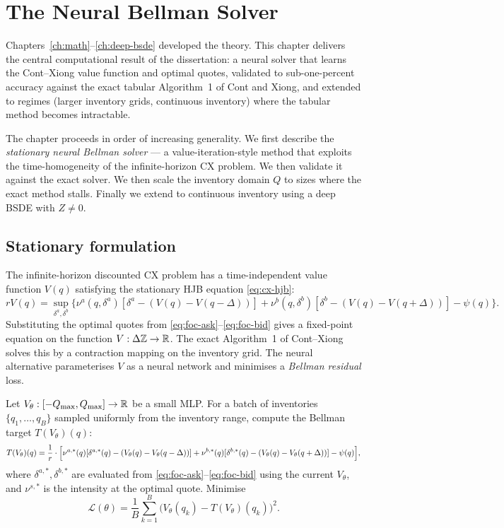 \chapter{The Neural Bellman Solver}
\label{ch:bellman}

Chapters~\ref{ch:math}--\ref{ch:deep-bsde} developed the theory. This chapter delivers the central computational result of the dissertation: a neural solver that learns the Cont--Xiong value function and optimal quotes, validated to sub-one-percent accuracy against the exact tabular Algorithm~1 of Cont and Xiong, and extended to regimes (larger inventory grids, continuous inventory) where the tabular method becomes intractable.

The chapter proceeds in order of increasing generality. We first describe the \emph{stationary neural Bellman solver} --- a value-iteration-style method that exploits the time-homogeneity of the infinite-horizon CX problem. We then validate it against the exact solver. We then scale the inventory domain $Q$ to sizes where the exact method stalls. Finally we extend to continuous inventory using a deep BSDE with $Z \neq 0$.

\section{Stationary formulation}
\label{sec:stationary}

The infinite-horizon discounted CX problem has a time-independent value function $V(q)$ satisfying the stationary HJB equation \eqref{eq:cx-hjb}:
\[
  r V(q) = \sup_{\delta^a, \delta^b} \bigl\{ \nu^a(q, \delta^a) [\delta^a - (V(q) - V(q - \Delta))] + \nu^b(q, \delta^b) [\delta^b - (V(q) - V(q + \Delta))] - \psi(q) \bigr\}.
\]
Substituting the optimal quotes from \eqref{eq:foc-ask}--\eqref{eq:foc-bid} gives a fixed-point equation on the function $V : \Delta \mathbb{Z} \to \mathbb{R}$. The exact Algorithm~1 of Cont--Xiong solves this by a contraction mapping on the inventory grid. The neural alternative parameterises $V$ as a neural network and minimises a \emph{Bellman residual} loss.

\begin{definition}
\label{def:neural-bellman}
Let $V_\theta : [-Q_{\max}, Q_{\max}] \to \mathbb{R}$ be a small MLP. For a batch of inventories $\{q_1, \ldots, q_B\}$ sampled uniformly from the inventory range, compute the Bellman target $T(V_\theta)(q)$:
\begin{equation}
  T(V_\theta)(q) = \frac{1}{r} \cdot \Bigl[\nu^{a,*}(q) [\delta^{a,*}(q) - (V_\theta(q) - V_\theta(q - \Delta))] + \nu^{b,*}(q) [\delta^{b,*}(q) - (V_\theta(q) - V_\theta(q + \Delta))] - \psi(q)\Bigr],
\end{equation}
where $\delta^{a,*}, \delta^{b,*}$ are evaluated from \eqref{eq:foc-ask}--\eqref{eq:foc-bid} using the current $V_\theta$, and $\nu^{s, *}$ is the intensity at the optimal quote. Minimise
\begin{equation}
  \mathcal{L}(\theta) = \frac{1}{B} \sum_{k=1}^{B} \bigl(V_\theta(q_k) - T(V_\theta)(q_k)\bigr)^2.
\end{equation}
\end{definition}

